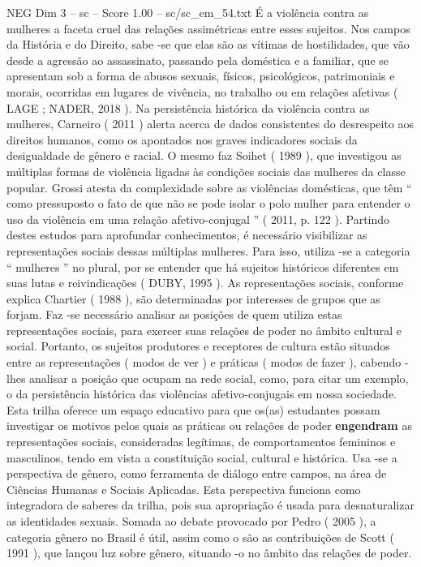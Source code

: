 \begin{textsample}{NEG Dim 3 – sc – Score 1.00 – sc/sc\_em\_54.txt}
É a violência contra as mulheres a faceta cruel das relações assimétricas entre esses sujeitos.
Nos campos da História e do Direito, sabe -se que elas são as vítimas de hostilidades, que vão desde a agressão ao assassinato, passando pela doméstica e a familiar, que se apresentam sob a forma de abusos sexuais, físicos, psicológicos, patrimoniais e morais, ocorridas em lugares de vivência, no trabalho ou em relações afetivas ( LAGE ; NADER, 2018 ).
Na persistência histórica da violência contra as mulheres, Carneiro ( 2011 ) alerta acerca de dados consistentes do desrespeito aos direitos humanos, como os apontados nos graves indicadores sociais da desigualdade de gênero e racial.
O mesmo faz Soihet ( 1989 ), que investigou as múltiplas formas de violência ligadas às condições sociais das mulheres da classe popular.
Grossi atesta da complexidade sobre as violências domésticas, que têm “ como pressuposto o fato de que não se pode isolar o polo mulher para entender o uso da violência em uma relação afetivo-conjugal ” ( 2011, p. 122 ).
Partindo destes estudos para aprofundar conhecimentos, é necessário visibilizar as representações sociais dessas múltiplas mulheres.
Para isso, utiliza -se a categoria “ mulheres ” no plural, por se entender que há sujeitos históricos diferentes em suas lutas e reivindicações ( DUBY, 1995 ).
As representações sociais, conforme explica Chartier ( 1988 ), são determinadas por interesses de grupos que as forjam.
Faz -se necessário analisar as posições de quem utiliza estas representações sociais, para exercer suas relações de poder no âmbito cultural e social.
Portanto, os sujeitos produtores e receptores de cultura estão situados entre as representações ( modos de ver ) e práticas ( modos de fazer ), cabendo -lhes analisar a posição que ocupam na rede social, como, para citar um exemplo, o da persistência histórica das violências afetivo-conjugais em nossa sociedade.
Esta trilha oferece um espaço educativo para que os(as) estudantes possam investigar os motivos pelos quais as práticas ou relações de poder \textbf{engendram} as representações sociais, consideradas legítimas, de comportamentos femininos e masculinos, tendo em vista a constituição social, cultural e histórica.
Usa -se a perspectiva de gênero, como ferramenta de diálogo entre campos, na área de Ciências Humanas e Sociais Aplicadas.
Esta perspectiva funciona como integradora de saberes da trilha, pois sua apropriação é usada para desnaturalizar as identidades sexuais.
Somada ao debate provocado por Pedro ( 2005 ), a categoria gênero no Brasil é útil, assim como o são as contribuições de Scott ( 1991 ), que lançou luz sobre gênero, situando -o no âmbito das relações de poder.

\end{textsample}
